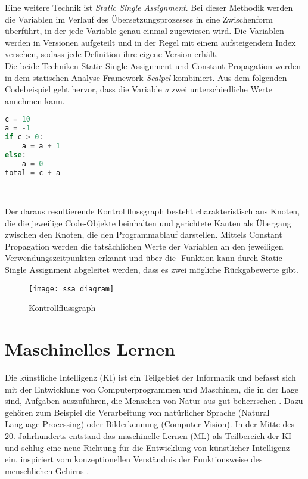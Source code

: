 \documentclass[german,bachelor]{swsLeipzig}
\begin{document}
Eine weitere Technik ist \textit{Static Single Assignment}.
Bei dieser Methodik werden die Variablen im Verlauf des Übersetzungsprozesses in eine Zwischenform überführt, in der jede Variable
genau einmal zugewiesen wird.
Die Variablen werden in Versionen aufgeteilt und in der Regel mit einem aufsteigendem Index versehen,
sodass jede Definition ihre eigene Version erhält.\\

Die beide Techniken Static Single Assignment und Constant Propagation werden in dem statischen Analyse-Framework
\textit{Scalpel} kombiniert.
Aus dem folgenden Codebeispiel geht hervor, dass die Variable \textit{a} zwei unterschiedliche Werte annehmen kann.\\

\begin{lstlisting}[language=Python, frame=single, basicstyle=\small]
c = 10
a = -1
if c > 0:
    a = a + 1
else:
    a = 0
total = c + a
\end{lstlisting}
\

Der daraus resultierende Kontrollflussgraph besteht charakteristisch aus Knoten, die die jeweilige Code-Objekte beinhalten und gerichtete Kanten als Übergang
zwischen den Knoten, die den Programmablauf darstellen.
Mittels Constant Propagation werden die tatsächlichen Werte der Variablen an den jeweiligen Verwendungszeitpunkten erkannt
und über die \textPhi-Funktion kann durch Static Single Assignment abgeleitet werden, dass es zwei mögliche Rückgabewerte gibt.

\begin{figure}[h]
 \centering
 \texttt{[image: ssa\_diagram]}
 \caption{Kontrollflussgraph \cite[]{li2022scalpel}}
 \label{fig:scalpel}
\end{figure}


\section{Maschinelles Lernen}
Die künstliche Intelligenz (KI) ist ein Teilgebiet der Informatik und befasst sich mit der Entwicklung von Computerprogrammen und Maschinen,
die in der Lage sind, Aufgaben auszuführen, die Menschen von Natur aus gut beherrschen \cite[]{2020}.
Dazu gehören zum Beispiel die Verarbeitung von natürlicher Sprache (Natural Language Processing) oder Bilderkennung (Computer Vision).
In der Mitte des 20. Jahrhunderts entstand das maschinelle Lernen (ML) als Teilbereich der KI und schlug eine neue Richtung
für die Entwicklung von künstlicher Intelligenz ein, inspiriert vom konzeptionellen Verständnis der Funktionsweise des menschlichen Gehirns \cite[]{2020}.\\
\end{document}
